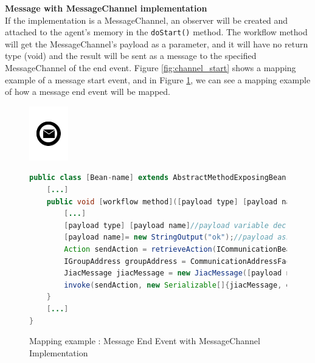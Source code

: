 \newpage
\textbf{Message with MessageChannel implementation}\\
If the implementation is a MessageChannel, an observer will be created and attached to the agent's memory in the \verb|doStart()| method.
The workflow method will get the MessageChannel's payload as a parameter, and it will have no return type (void) and the result will be sent as a message to the specified MessageChannel of the end event. Figure \ref{fig:channel_start} shows a mapping example of a message start event, and in Figure \ref{fig:channel_end}, we can see a mapping example of how a message end event will be mapped. 
\begin{figure}[h]
\begin{minipage}[c]{0.28\textwidth}
\includegraphics{images/mapping/message_end.png}
\end{minipage}
\begin{minipage}[c]{0.72\textwidth}
\begin{lstlisting}[language = Java]
public class [Bean-name] extends AbstractMethodExposingBean{
	[...]
	public void [workflow method]([payload type] [payload name]){
		[...]
		[payload type] [payload name]//payload variable declaration
		[payload name]= new StringOutput("ok");//payload assignment
		Action sendAction = retrieveAction(ICommunicationBean.ACTION_SEND);
		IGroupAddress groupAddress = CommunicationAddressFactory.createGroupAddress([channel]);
		JiacMessage jiacMessage = new JiacMessage([payload name]);
		invoke(sendAction, new Serializable[]{jiacMessage, groupAddress});
	}
	[...]
}
\end{lstlisting}
\end{minipage}
\caption{Mapping example : Message End Event with MessageChannel Implementation}%
\label{fig:channel_end}
\end{figure}
